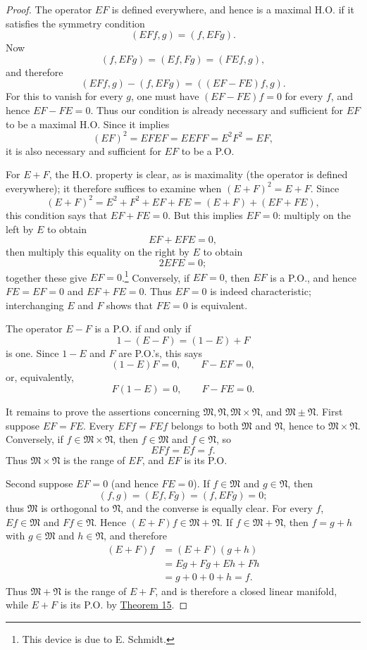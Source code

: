 ﻿\documentclass[paper=b5,fontsize=13pt,bookmarkpackage=false,twoside]{scrartcl}
\begin{document}
\begin{proof}
The operator $EF$ is defined everywhere, and hence is a maximal H.O. if it satisfies the symmetry condition
\[
(EFf,g)=(f,EFg).
\]
Now
\[
(f,EFg)=(Ef,Fg)=(FEf,g),
\]
and therefore
\[
(EFf,g)-(f,EFg)=((EF-FE)f,g).
\]
For this to vanish for every $g$, one must have $(EF-FE)f=0$ for every $f$, and hence $EF-FE=0$. Thus our condition is already necessary and sufficient for $EF$ to be a maximal H.O. Since it implies
\[
(EF)^2=EFEF=EEFF=E^2F^2=EF,
\]
it is also necessary and sufficient for $EF$ to be a P.O.

For $E+F$, the H.O. property is clear, as is maximality (the operator is defined everywhere); it therefore suffices to examine when $(E+F)^2=E+F$. Since
\[
(E+F)^2=E^2+F^2+EF+FE=(E+F)+(EF+FE),
\]
this condition says that $EF+FE=0$. But this implies $EF=0$: multiply on the left by $E$ to obtain
\[
EF+EFE=0,
\]
then multiply this equality on the right by $E$ to obtain
\[
2EFE=0;
\]
together these give $EF=0$.\footnote{\label{fn:38}This device is due to E. Schmidt.} Conversely, if $EF=0$, then $EF$ is a P.O., and hence $FE=EF=0$ and $EF+FE=0$. Thus $EF=0$ is indeed characteristic; interchanging $E$ and $F$ shows that $FE=0$ is equivalent.

The operator $E-F$ is a P.O. if and only if
\[
1-(E-F)=(1-E)+F
\]
is one. Since $1-E$ and $F$ are P.O.'s, this says
\[
(1-E)F=0,\qquad F-EF=0,
\]
or, equivalently,
\[
F(1-E)=0,\qquad F-FE=0.
\]

It remains to prove the assertions concerning $\mathfrak M,\mathfrak N,\mathfrak M\times\mathfrak N$, and $\mathfrak M\pm\mathfrak N$. First suppose $EF=FE$. Every $EFf=FEf$ belongs to both $\mathfrak M$ and $\mathfrak N$, hence to $\mathfrak M\times\mathfrak N$. Conversely, if $f\in\mathfrak M\times\mathfrak N$, then $f\in\mathfrak M$ and $f\in\mathfrak N$, so
\[
EFf=Ef=f.
\]
Thus $\mathfrak M\times\mathfrak N$ is the range of $EF$, and $EF$ is its P.O.

Second suppose $EF=0$ (and hence $FE=0$). If $f\in\mathfrak M$ and $g\in\mathfrak N$, then
\[
(f,g)=(Ef,Fg)=(f,EFg)=0;
\]
thus $\mathfrak M$ is orthogonal to $\mathfrak N$, and the converse is equally clear. For every $f$, $Ef\in\mathfrak M$ and $Ff\in\mathfrak N$.
Hence $(E+F)f\in\mathfrak M+\mathfrak N$. If $f\in\mathfrak M+\mathfrak N$, then $f=g+h$ with $g\in\mathfrak M$ and $h\in\mathfrak N$, and therefore
\begin{align*}
(E+F)f
 &=(E+F)(g+h)\\
 &=Eg+Fg+Eh+Fh\\
 &=g+0+0+h=f.
\end{align*}
Thus $\mathfrak M+\mathfrak N$ is the range of $E+F$, and is therefore a closed linear manifold, while $E+F$ is its P.O. by \hyperref[thm:15]{Theorem 15}.


\end{proof}
\end{document}
